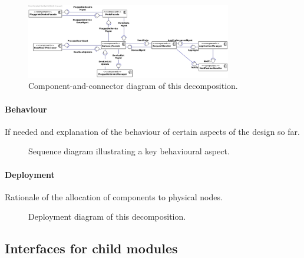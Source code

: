     \begin{figure}[!htp]
    	\centering
    	\includegraphics[width=0.8\textwidth]{component-diagram-1}
    	\caption{Component-and-connector diagram of this decomposition.}
        \label{fig:it1-cc_main}
    \end{figure}

    \paragraph{Behaviour}
    If needed and explanation of the behaviour of certain aspects of the design so
    far.

    \begin{figure}[!htp]
    	\centering
    	\caption{Sequence diagram illustrating a key behavioural aspect.
    	}\label{fig:it1-seq_aspect1}
    \end{figure}

    \paragraph{Deployment}
    Rationale of the allocation of components to physical nodes.

    \begin{figure}[!htp]
    	\centering
    	\caption{Deployment diagram of this decomposition.
    	}\label{fig:it1-depl_main}
    \end{figure}

\subsection{Interfaces for child modules}
